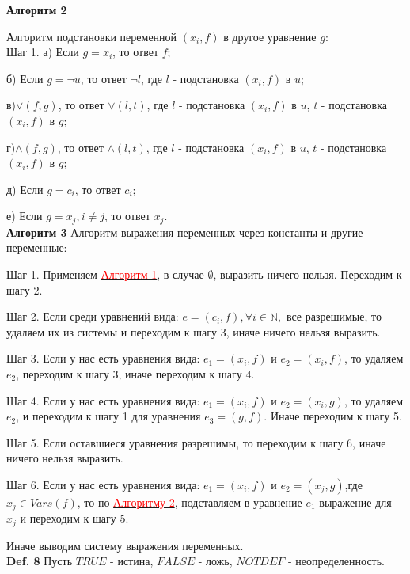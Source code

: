 \documentclass[12pt]{article}
\begin{document}
    \hypertarget{a2}{{\bf Алгоритм 2}} Алгоритм подстановки переменной $ (x_{i},f) $ в другое уравнение $g$: 
    \\
    Шаг 1. а) Если $g = x_{i}$, то ответ  $f$;
    
    б) Если $g = \neg{u}$, то ответ $\neg{l}$, где $l$ - подстановка $ (x_{i},f) $ в $u$;
    
    в)$\vee (f, g)$, то ответ $\vee(l,t)$, где $l$ - подстановка $ (x_{i},f) $ в $u$,  $t$ - подстановка $ (x_{i},f) $ в $g$;
    
    г)$\wedge (f, g)$, то ответ $\wedge(l,t)$, где $l$ - подстановка $ (x_{i},f) $ в $u$, $t$ - подстановка $ (x_{i},f) $ в $g$;
    
    д) Если $g = c_{i}$, то ответ $c_{i}$;
    
    е) Если $g = x_{j}, i \neq j$, то ответ $x_{j}$.
     \\
     
      \hypertarget{a3}{{\bf Алгоритм 3}} Алгоритм выражения переменных через константы и другие переменные:
     
     Шаг 1. Применяем \hyperlink{a1}{ \textcolor{red} {Алгоритм 1}}, в случае  $   \emptyset $, выразить ничего нельзя. Переходим к шагу 2.
     
     Шаг 2. Если среди уравнений вида: $e =(c_{i},f), \forall i \in \mathbb{N},$ все разрешимые, то удаляем  их из системы и переходим к шагу 3, иначе ничего нельзя выразить.
     
     
     Шаг 3. Если у нас есть уравнения вида: $e_{1} =(x_{i},f)$ и $e_{2} =(x_{i},f)$, то удаляем $e_{2}$, переходим к шагу 3, иначе переходим к шагу 4.
     
     Шаг 4. Если у нас есть уравнения вида: $e_{1} =(x_{i},f)$ и $e_{2} =(x_{i},g)$, то удаляем $e_{2}$, и переходим к  шагу 1 для  уравнения   $e_{3} =(g,f)$. Иначе переходим к шагу 5.
     
     Шаг 5. Если оставшиеся уравнения разрешимы, то переходим к шагу 6, иначе ничего нельзя выразить.
     
     Шаг 6. Если у нас есть уравнения вида: $e_{1} =(x_{i},f)$ и $e_{2} =(x_{j},g)$,где $x_{j} \in Vars(f)$, то по \hyperlink{a2}{ \textcolor{red}{Алгоритму 2}}, подставляем в уравнение $e_{1}$ выражение для $x_{j}$ и переходим к шагу 5. 
     
     Иначе выводим систему выражения переменных. 
     \\
     
     {\bf Def. 8} Пусть $TRUE$ - истина, $FALSE$ - ложь, $NOTDEF$ - неопределенность.
     \\
     
\end{document}
